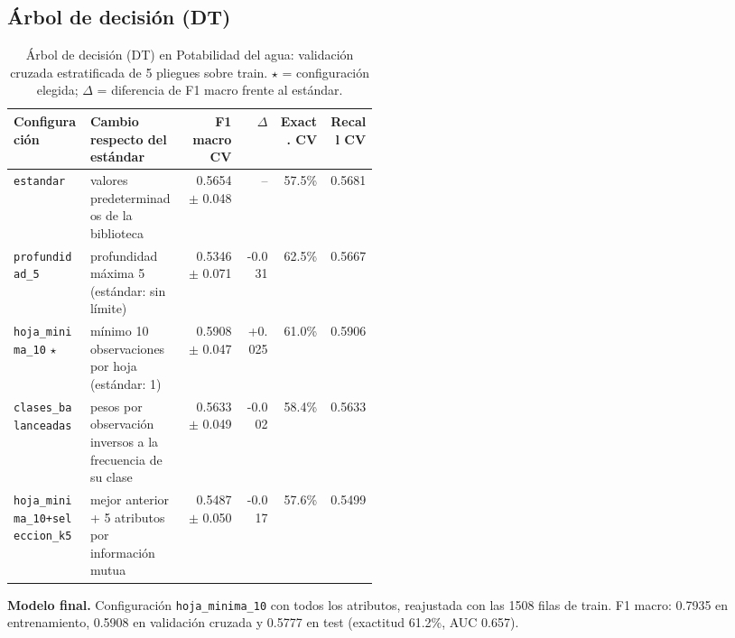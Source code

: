 \documentclass[11pt]{article}
\begin{document}
\FloatBarrier

\subsection{Árbol de decisión (DT)}

\begin{table}[H]\centering\footnotesize
\caption{Árbol de decisión (DT) en Potabilidad del agua: validación cruzada estratificada de 5 pliegues sobre train. $\star$ = configuración elegida; $\Delta$ = diferencia de F1 macro frente al estándar.}
\begin{tabular}{>{\raggedright\arraybackslash}p{0.21\linewidth}>{\raggedright\arraybackslash}p{0.26\linewidth}rrrr}\toprule
Configuración & Cambio respecto del estándar & F1 macro CV & $\Delta$ & Exact. CV & Recall CV \\ \midrule
\texttt{estandar} & valores predeterminados de la biblioteca & 0.5654 $\pm$ 0.048 & -- & 57.5\% & 0.5681 \\
\texttt{profundidad\_\allowbreak{}5} & profundidad máxima 5 (estándar: sin límite) & 0.5346 $\pm$ 0.071 & -0.031 & 62.5\% & 0.5667 \\
\texttt{hoja\_\allowbreak{}minima\_\allowbreak{}10} $\star$ & mínimo 10 observaciones por hoja (estándar: 1) & 0.5908 $\pm$ 0.047 & +0.025 & 61.0\% & 0.5906 \\
\texttt{clases\_\allowbreak{}balanceadas} & pesos por observación inversos a la frecuencia de su clase & 0.5633 $\pm$ 0.049 & -0.002 & 58.4\% & 0.5633 \\
\texttt{hoja\_\allowbreak{}minima\_\allowbreak{}10+\allowbreak{}seleccion\_\allowbreak{}k5} & mejor anterior + 5 atributos por información mutua & 0.5487 $\pm$ 0.050 & -0.017 & 57.6\% & 0.5499 \\
\bottomrule\end{tabular}
\end{table}

\textbf{Modelo final.} Configuración \texttt{hoja\_\allowbreak{}minima\_\allowbreak{}10} con todos los atributos, reajustada con las 1508 filas de train. F1 macro: 0.7935 en entrenamiento, 0.5908 en validación cruzada y 0.5777 en test (exactitud 61.2\%, AUC 0.657).
\end{document}
